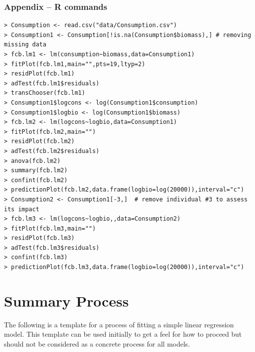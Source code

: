 \documentclass[10pt,openany]{book}\usepackage[]{graphicx}\usepackage[]{color}
\begin{document}
\vspace{-24pt}
\subsubsection*{Appendix -- R commands}
\vspace{-18pt}
\begin{Verbatim}[formatcom=\color{red},xleftmargin=5mm,commandchars=\\\{\}]
> Consumption <- read.csv("data/Consumption.csv")
> Consumption1 <- Consumption[!is.na(Consumption$biomass),] # removing missing data
> fcb.lm1 <- lm(consumption~biomass,data=Consumption1)
> fitPlot(fcb.lm1,main="",pts=19,ltyp=2)
> residPlot(fcb.lm1)
> adTest(fcb.lm1$residuals)
> transChooser(fcb.lm1)
> Consumption1$logcons <- log(Consumption1$consumption)
> Consumption1$logbio <- log(Consumption1$biomass)
> fcb.lm2 <- lm(logcons~logbio,data=Consumption1)
> fitPlot(fcb.lm2,main="")
> residPlot(fcb.lm2)
> adTest(fcb.lm2$residuals)
> anova(fcb.lm2)
> summary(fcb.lm2)
> confint(fcb.lm2)
> predictionPlot(fcb.lm2,data.frame(logbio=log(20000)),interval="c")
> Consumption2 <- Consumption1[-3,]  # remove individual #3 to assess its impact
> fcb.lm3 <- lm(logcons~logbio,,data=Consumption2)
> fitPlot(fcb.lm3,main="")
> residPlot(fcb.lm3)
> adTest(fcb.lm3$residuals)
> confint(fcb.lm3)
> predictionPlot(fcb.lm3,data.frame(logbio=log(20000)),interval="c")
\end{Verbatim}

\clearpage
\section{Summary Process}
The following is a template for a process of fitting a simple linear regression model.  This template can be used initially to get a feel for how to proceed but should not be considered as a concrete process for all models.
\end{document}
